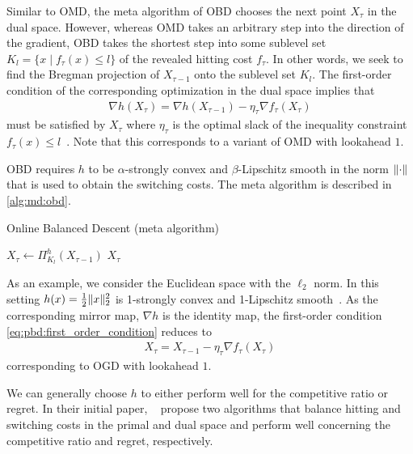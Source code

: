Similar to OMD, the meta algorithm of OBD chooses the next point $X_{\tau}$ in the dual space. However, whereas OMD takes an arbitrary step into the direction of the gradient, OBD takes the shortest step into some sublevel set $K_l = \{x \mid f_{\tau}(x) \leq l\}$ of the revealed hitting cost $f_{\tau}$. In other words, we seek to find the Bregman projection of $X_{\tau-1}$ onto the sublevel set $K_l$. The first-order condition of the corresponding optimization in the dual space implies that \begin{align}\label{eq:pbd:first_order_condition}
    \nabla h(X_{\tau}) = \nabla h(X_{\tau-1}) - \eta_{\tau} \nabla f_{\tau}(X_{\tau})
\end{align} must be satisfied by $X_{\tau}$ where $\eta_{\tau}$ is the optimal slack of the inequality constraint $f_{\tau}(x) \leq l$~\cite{Goel2018}. Note that this corresponds to a variant of OMD with lookahead $1$.

OBD requires $h$ to be $\alpha$-strongly convex and $\beta$-Lipschitz smooth in the norm $\lVert\cdot\rVert$ that is used to obtain the switching costs. The meta algorithm is described in \cref{alg:md:obd}.

\begin{algorithm}
    \caption{Online Balanced Descent (meta algorithm)~\cite{Goel2018}}\label{alg:md:obd}
    $X_{\tau} \gets \Pi_{K_l}^h(X_{\tau-1})$\;
    \Return $X_{\tau}$\;
\end{algorithm}

As an example, we consider the Euclidean space with the $\ell_2$ norm. In this setting $h(x) = \frac{1}{2} \lVert x\rVert_2^2$ is 1-strongly convex and 1-Lipschitz smooth~\cite{Goel2018}. As the corresponding mirror map, $\nabla h$ is the identity map, the first-order condition \cref{eq:pbd:first_order_condition} reduces to \begin{align*}
    X_{\tau} = X_{\tau-1} - \eta_{\tau} \nabla f_{\tau}(X_{\tau})
\end{align*} corresponding to OGD with lookahead $1$.

We can generally choose $h$ to either perform well for the competitive ratio or regret. In their initial paper, \citeauthor*{Goel2018}~\cite{Goel2018} propose two algorithms that balance hitting and switching costs in the primal and dual space and perform well concerning the competitive ratio and regret, respectively.

